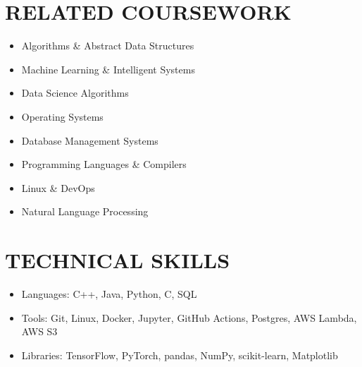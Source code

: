 \documentclass[11pt, a4paper, roman]{moderncv}
\newcommand{\entry}[4]{
	\textbf{#2}\:$|$\:#1 
	\hfill\textit{#3}
	#4
	\vspace{2mm}
}
\begin{document}

\begin{multicols}{2}
\section{RELATED COURSEWORK}
{\begin{itemize}
    \item Algorithms \& Abstract Data Structures
    \item Machine Learning \& Intelligent Systems
    \item Data Science Algorithms
    \item Operating Systems
    \item Database Management Systems
    \item Programming Languages \& Compilers
    \item Linux \& DevOps
    \item Natural Language Processing
  \end{itemize}
}

\columnbreak

\section{TECHNICAL SKILLS}
{\begin{itemize}
    \item Languages: C++, Java, Python, C, SQL
    \item Tools: Git, Linux, Docker, Jupyter, GitHub Actions, Postgres, AWS Lambda, AWS S3
    \item Libraries: TensorFlow, PyTorch, pandas, NumPy, scikit-learn, Matplotlib
  \end{itemize}
}
\end{multicols}
\end{document}
